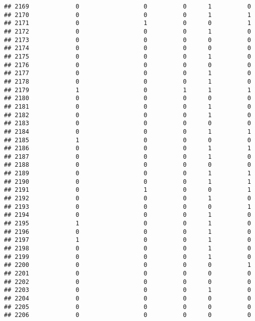 \documentclass[
]{article}
\begin{document}
\begin{verbatim}
## 2169             0                  0          0      1          0
## 2170             0                  0          0      1          1
## 2171             0                  1          0      0          1
## 2172             0                  0          0      1          0
## 2173             0                  0          0      0          0
## 2174             0                  0          0      0          0
## 2175             0                  0          0      1          0
## 2176             0                  0          0      0          0
## 2177             0                  0          0      1          0
## 2178             0                  0          0      1          0
## 2179             1                  0          1      1          1
## 2180             0                  0          0      0          0
## 2181             0                  0          0      1          0
## 2182             0                  0          0      1          0
## 2183             0                  0          0      0          0
## 2184             0                  0          0      1          1
## 2185             1                  0          0      0          0
## 2186             0                  0          0      1          1
## 2187             0                  0          0      1          0
## 2188             0                  0          0      0          0
## 2189             0                  0          0      1          1
## 2190             0                  0          0      1          1
## 2191             0                  1          0      0          1
## 2192             0                  0          0      1          0
## 2193             0                  0          0      0          1
## 2194             0                  0          0      1          0
## 2195             1                  0          0      1          0
## 2196             0                  0          0      1          0
## 2197             1                  0          0      1          0
## 2198             0                  0          0      1          0
## 2199             0                  0          0      1          0
## 2200             0                  0          0      0          1
## 2201             0                  0          0      0          0
## 2202             0                  0          0      0          0
## 2203             0                  0          0      1          0
## 2204             0                  0          0      0          0
## 2205             0                  0          0      0          0
## 2206             0                  0          0      0          0

\end{verbatim}
\end{document}
